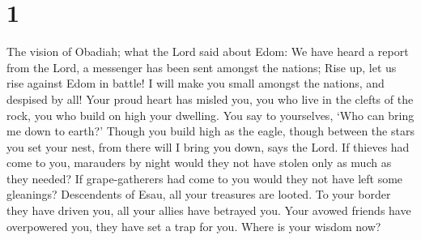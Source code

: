 \hypertarget{section}{%
\section{1}\label{section}}

 The vision of Obadiah; what the Lord said about Edom: We
have heard a report from the Lord, a messenger has been sent amongst the
nations; Rise up, let us rise against Edom in battle!  I
will make you small amongst the nations, and despised by all!
 Your proud heart has misled you, you who live in the clefts
of the rock, you who build on high your dwelling. You say to yourselves,
`Who can bring me down to earth?'  Though you build high as
the eagle, though between the stars you set your nest, from there will I
bring you down, says the Lord.  If thieves had come to you,
marauders by night would they not have stolen only as much as they
needed? If grape-gatherers had come to you would they not have left some
gleanings?  Descendents of Esau, all your treasures are
looted.  To your border they have driven you, all your
allies have betrayed you. Your avowed friends have overpowered you, they
have set a trap for you. Where is your wisdom now?

